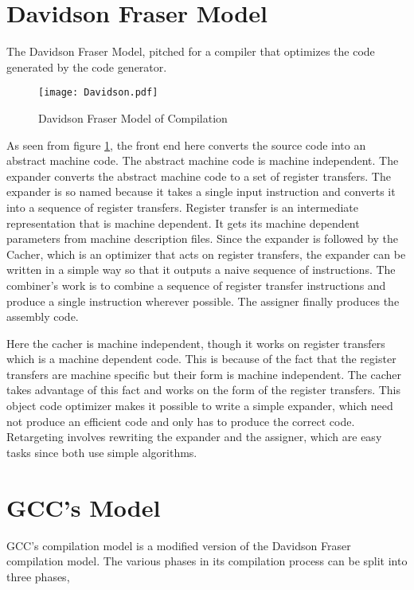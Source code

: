 \section{Davidson Fraser Model}

The Davidson Fraser Model\cite{Davidson}, pitched for a compiler that optimizes the code generated by the code generator. 
\begin{figure}[htb!]
\centering%
\texttt{[image: Davidson.pdf]}
\caption{Davidson Fraser Model of Compilation\cite{Davidson}}
\label{fig:FigureDavidson}
\end{figure}


As seen from figure \ref{fig:FigureDavidson}, the front end here converts the source code into an abstract machine code. The abstract machine
 code is machine independent. The
expander converts the abstract machine code to a set of register transfers. The expander is so named
because it takes a single input instruction and converts it into a sequence of register transfers. Register transfer is an intermediate
representation that is machine dependent. It gets its machine dependent parameters from machine description files.
 Since the expander is followed
by the Cacher, which is an optimizer that acts on register transfers, the expander can be written in a simple way so that it outputs a naive 
sequence of instructions. The combiner's work is to combine a sequence of register transfer instructions and produce 
a single instruction wherever possible. The assigner finally produces the assembly code.


Here the cacher is machine independent, though it works on register transfers which is a machine dependent code. 
This is because of the fact 
that the register transfers are machine specific but their form is machine independent\cite{Davidson}. The cacher takes advantage of this
fact and works on the form of the register transfers.
This object code optimizer makes it possible to write a simple expander, 
which need not produce an efficient code and only has to produce the correct code. Retargeting involves rewriting the expander and the
assigner, which are easy tasks since both use simple algorithms.

 
\section{GCC's Model}
GCC's compilation model is a modified version of the Davidson Fraser compilation model. The various phases in its compilation
process can be split into three phases\cite{gccwiki},

